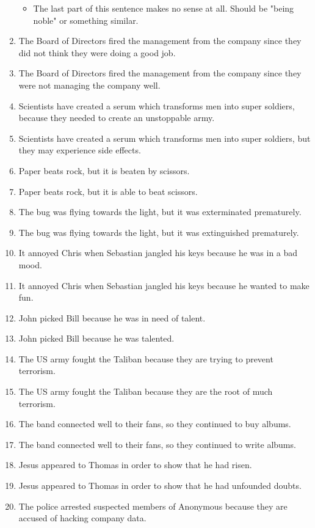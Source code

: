 \documentclass{article}
\begin{document}
\begin{enumerate}
		\begin{itemize}
			\item The last part of this sentence makes no sense at all. Should be "being noble" or something similar.
		\end{itemize}
	\item The Board of Directors fired the management from the company since they did not think they were doing a good job.
	\item The Board of Directors fired the management from the company since they were not managing the company well.
	\item Scientists have created a serum which transforms men into super soldiers, because they needed to create an unstoppable army.
	\item Scientists have created a serum which transforms men into super soldiers, but they may experience side effects.
	\item Paper beats rock, but it is beaten by scissors.
	\item Paper beats rock, but it is able to beat scissors.
	\item The bug was flying towards the light, but it was exterminated prematurely.
	\item The bug was flying towards the light, but it was extinguished prematurely.
	\item It annoyed Chris when Sebastian jangled his keys because he was in a bad mood.
	\item It annoyed Chris when Sebastian jangled his keys because he wanted to make fun.
	\item John picked Bill because he was in need of talent.
	\item John picked Bill because he was talented.
	\item The US army fought the Taliban because they are trying to prevent terrorism.
	\item The US army fought the Taliban because they are the root of much terrorism.
	\item The band connected well to their fans, so they continued to buy albums.
	\item The band connected well to their fans, so they continued to write albums.
	\item Jesus appeared to Thomas in order to show that he had risen.
	\item Jesus appeared to Thomas in order to show that he had unfounded doubts.
	\item The police arrested suspected members of Anonymous because they are accused of hacking company data.

\end{enumerate}
\end{document}
